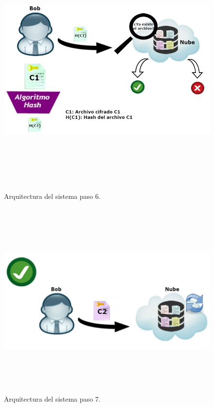 \begin{figure}[H]
\centering
\includegraphics[width=16cm, height=13cm]{./images/Paso05.jpg}
\caption{Arquitectura del sistema paso 6.}

\end{figure}

\begin{figure}[H]
\centering
\includegraphics[width=16cm, height=10cm]{./images/Paso06.jpg}
\caption{Arquitectura del sistema paso 7.}

\end{figure}

